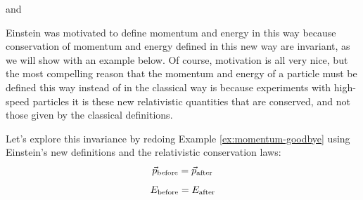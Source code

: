
and


Einstein was motivated to define momentum and energy in this way
because conservation of momentum and energy defined in this
new way are invariant, as we will show with an example below.  Of
course, motivation is all very nice, but the most compelling reason
that the momentum and energy of a particle must be defined this way
instead of in the classical way is because experiments with high-speed
particles it is these new relativistic quantities that are conserved,
and not those given by the classical definitions.

Let's explore this invariance by redoing Example \ref{ex:momentum-goodbye} 
using Einstein's new definitions and the relativistic conservation laws:
\begin{equation}
\vec{p}_{\rm before} = \vec{p}_{\rm after}
\end{equation}
\begin{equation}
E_{\rm before} = E_{\rm after}
\label{eq:econs}
\end{equation}


